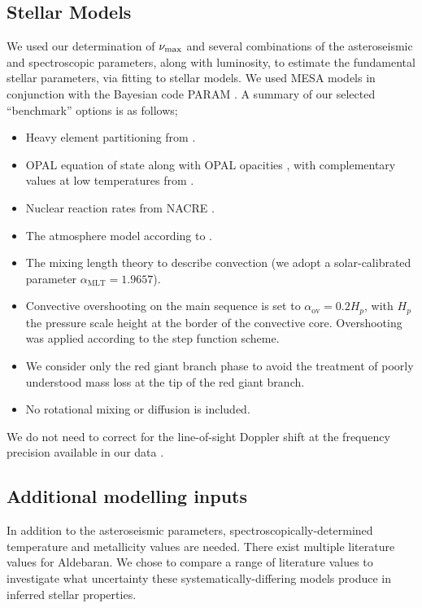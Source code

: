 \documentclass[modern]{aastex61}
\newcommand{\numax}{\mbox{$\nu_{\rm max}$}\xspace}
\begin{document}
\subsection{Stellar Models}\label{sec:stell_mod}
We used our determination of \numax and several combinations of the asteroseismic and spectroscopic parameters, along with luminosity, to estimate the fundamental stellar parameters, via fitting to stellar models. We used \textsc{MESA} models \citep{2011Paxton,2013Paxton} in conjunction with the Bayesian code \textsc{PARAM} \citep{2006dasilva, 2017Rod}.  A summary of our selected ``benchmark'' options is as follows;
\begin{itemize}%
\item Heavy element partitioning from \cite{1993Grevesse}.
\item OPAL equation of state \citep{2002Rogers} along with OPAL opacities \citep{1996Iglesias}, with complementary values at low temperatures from \cite{2005Ferguson}.
\item Nuclear reaction rates from NACRE \citep{1999Angulo}.
\item The atmosphere model according to \cite{1966Kris}.
\item The mixing length theory to describe convection (we adopt a solar-calibrated parameter $\alpha_{\textrm{MLT}} =1.9657$).
\item Convective overshooting on the main sequence is set to $\alpha_{\textrm{ov}}=0.2H_{p}$, with $H_{p}$ the pressure scale height at the border of the convective core. Overshooting was applied according to the \cite{1975Maeder} step function
scheme.
\item We consider only the red giant branch phase to avoid the treatment of poorly understood mass loss at the tip of the red giant branch.
\item No rotational mixing or diffusion is included.
\end{itemize}
We do not need to correct for the line-of-sight Doppler shift at the frequency precision available in our data \citep{2014MNRAS.445L..94D}.
\subsection{Additional modelling inputs}\label{sec:addmod}
In addition to the asteroseismic parameters, spectroscopically-determined temperature and metallicity values are needed. There exist multiple literature values for Aldebaran. We chose to compare a range of literature values to investigate what uncertainty these systematically-differing models produce in inferred stellar properties.
\end{document}
